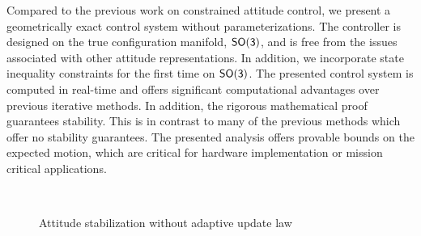 \documentclass[10pt,fleqn]{IJCAS}  %
\begin{document}
\begin{multicols}{2}
Compared to the previous work on constrained attitude control, we present a geometrically exact control system without parameterizations.
The controller is designed on the true configuration manifold, \( \mathsf{SO(3)} \), and is free from the issues associated with other attitude representations.
In addition, we incorporate state inequality constraints for the first time on \( \mathsf{SO(3)} \).
The presented control system is computed in real-time and offers significant computational advantages over previous iterative methods. 
In addition, the rigorous mathematical proof guarantees stability.
This is in contrast to many of the previous methods which offer no stability guarantees.
The presented analysis offers provable bounds on the expected motion, which are critical for hardware implementation or mission critical applications.

\end{multicols}
\begin{figure}[b]
    \centering 
    ~
    \caption{Attitude stabilization without adaptive update law}
    \label{fig:con} 
\end{figure}
\end{document}
